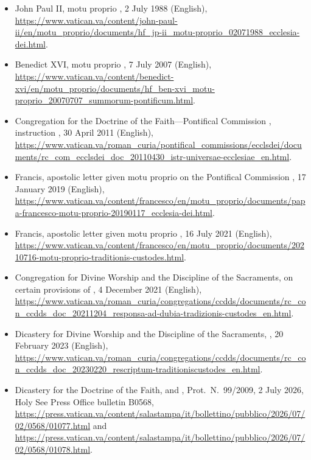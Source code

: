 \begin{itemize}
\item John Paul II, motu proprio , 2 July 1988
(English),
\url{https://www.vatican.va/content/john-paul-ii/en/motu_proprio/documents/hf_jp-ii_motu-proprio_02071988_ecclesia-dei.html}.
\item Benedict XVI, motu proprio , 7 July 2007
(English),
\url{https://www.vatican.va/content/benedict-xvi/en/motu_proprio/documents/hf_ben-xvi_motu-proprio_20070707_summorum-pontificum.html}.
\item Congregation for the Doctrine of the Faith---Pontifical Commission
, instruction , 30 April 2011
(English),
\url{https://www.vatican.va/roman_curia/pontifical_commissions/ecclsdei/documents/rc_com_ecclsdei_doc_20110430_istr-universae-ecclesiae_en.html}.
\item Francis, apostolic letter given motu proprio on the Pontifical
Commission , 17 January 2019 (English),
\url{https://www.vatican.va/content/francesco/en/motu_proprio/documents/papa-francesco-motu-proprio-20190117_ecclesia-dei.html}.
\item Francis, apostolic letter given motu proprio , 16 July 2021 (English),
\url{https://www.vatican.va/content/francesco/en/motu_proprio/documents/20210716-motu-proprio-traditionis-custodes.html}.
\item Congregation for Divine Worship and the Discipline of the
Sacraments,  on certain provisions of
, 4 December 2021 (English),
\url{https://www.vatican.va/roman_curia/congregations/ccdds/documents/rc_con_ccdds_doc_20211204_responsa-ad-dubia-tradizionis-custodes_en.html}.
\item Dicastery for Divine Worship and the Discipline of the Sacraments,
, 20 February 2023 (English),
\url{https://www.vatican.va/roman_curia/congregations/ccdds/documents/rc_con_ccdds_doc_20230220_rescriptum-traditioniscustodes_en.html}.
\item Dicastery for the Doctrine of the Faith,  and
, Prot.\ N.~99/2009, 2 July 2026, Holy See Press
Office bulletin B0568,
\url{https://press.vatican.va/content/salastampa/it/bollettino/pubblico/2026/07/02/0568/01077.html}
and
\url{https://press.vatican.va/content/salastampa/it/bollettino/pubblico/2026/07/02/0568/01078.html}.
\end{itemize}

